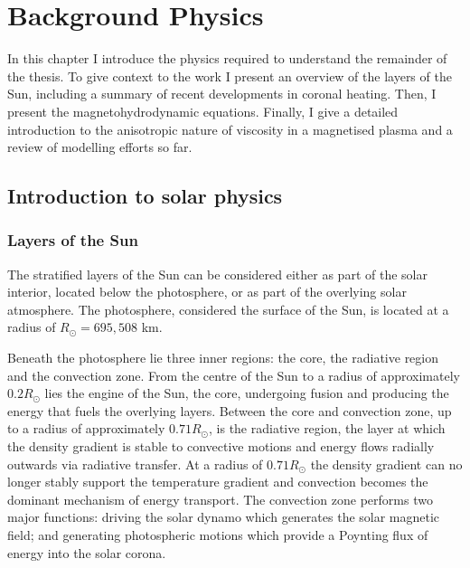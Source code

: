 \chapter{Background Physics}
\label{chp:background}

\graphicspath{{images/background/}}

In this chapter I introduce the physics required to understand the remainder of the thesis. To give context to the work I present an overview of the layers of the Sun, including a summary of recent developments in coronal heating. Then, I present the magnetohydrodynamic equations. Finally, I give a detailed introduction to the anisotropic nature of viscosity in a magnetised plasma and a review of modelling efforts so far.

\section{Introduction to solar physics}

\subsection{Layers of the Sun}

The stratified layers of the Sun can be considered either as part of the solar interior, located below the photosphere, or as part of the overlying solar atmosphere. The photosphere, considered the surface of the Sun, is located at a radius of $R_{\odot} = 695,508$ km.

Beneath the photosphere lie three inner regions: the core, the radiative region and the convection zone. From the centre of the Sun to a radius of approximately $0.2 R_{\odot}$ lies the engine of the Sun, the core, undergoing fusion and producing the energy that fuels the overlying layers. Between the core and convection zone, up to a radius of approximately  $0.71R_{\odot}$, is the radiative region, the layer at which the density gradient is stable to convective motions and energy flows radially outwards via radiative transfer. At a radius of $0.71R_{\odot}$ the density gradient can no longer stably support the temperature gradient and convection becomes the dominant mechanism of energy transport. The convection zone performs two major functions: driving the solar dynamo which generates the solar magnetic field; and generating photospheric motions which provide a Poynting flux of energy into the solar corona.

